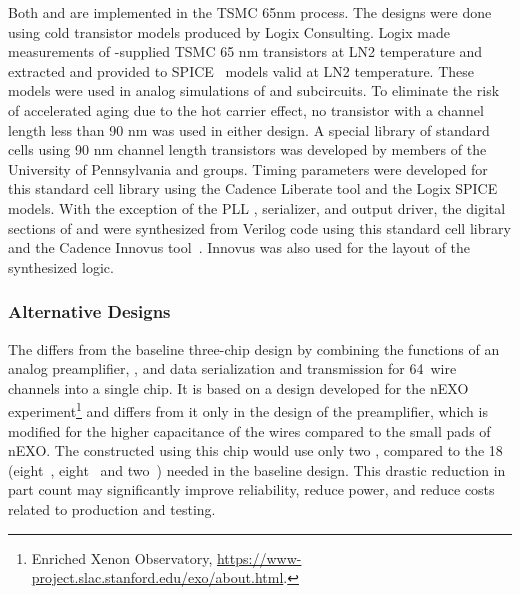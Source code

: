 Both  and  are implemented in the TSMC 65nm  process.\cite{TSMC65} The designs were done using cold transistor models produced by Logix Consulting.\cite{Logix} Logix made measurements of -supplied TSMC 65 nm transistors at LN2 temperature and extracted and provided to  SPICE~\cite{spice} models valid at LN2 temperature.  These models were used in analog simulations of  and  subcircuits.  To eliminate the risk of accelerated aging due to the hot carrier effect,\cite{Hot-electron} no transistor with a channel length less than 90 nm was used in either  design.  A special library of standard cells using 90 nm channel length transistors was developed by members of the University of Pennsylvania and  groups.  Timing parameters were developed for this standard cell library using the Cadence Liberate tool\cite{Liberate} and the Logix SPICE models.  With the exception of the  PLL , serializer, and output driver, the digital sections of  and  were synthesized from Verilog code using this standard cell library and the Cadence Innovus tool~\cite{Innovus}. Innovus was also used for the layout of the synthesized logic.


\subsubsection{Alternative Designs}
\label{sec:fdsp-tpcelec-design-femb-alt}


\label{sec:fdsp-tpcelec-design-femb-alt-cryo}

The    differs from the baseline three-chip design by combining the functions of an analog preamplifier, , and data serialization and transmission for \num{64}~wire channels into a single chip.
It is based on a design developed for the nEXO experiment\footnote{Enriched Xenon Observatory, \url{https://www-project.slac.stanford.edu/exo/about.html}.} and differs from it only in the design of the preamplifier, which is modified for the higher capacitance of the   wires compared to the small pads of nEXO.
The  constructed using this chip would use only two , compared to the \num{18} (eight~, eight~ and two~) needed in the baseline design.
This drastic reduction in part count may significantly improve  reliability, reduce power, and reduce costs related to production and testing. 

